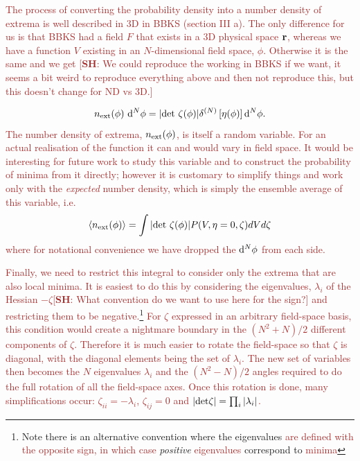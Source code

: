 \documentclass[12pt]{article}
\newcommand{\SH}[1]{\textcolor{brown}{[{\bf SH}: #1]}}
\newcommand{\sh}[1]{\textcolor{brown}{#1}}
\begin{document}
\sh{The process of converting the probability density into a number density of extrema is well described in 3D in BBKS \cite{BBKS} (section III a). The only difference for us is that BBKS had a field $F$ that exists in a 3D physical space ${\bf r}$, whereas we have a function $V$ existing in an $N$-dimensional field space, $\phi$. Otherwise it is the same and we get} \SH{We could reproduce the working in BBKS if we want, it seems a bit weird to reproduce everything above and then not reproduce this, but this doesn't change for ND vs 3D.}

\begin{equation}
n_{\rm ext}(\phi) \,\,{\rm d}^N \phi= |{\rm det}\,\, \zeta(\phi)| \delta^{(N)}\left[ \eta(\phi)\right] {\rm d}^N \phi.
\end{equation}
%
\sh{The number density of extrema, $n_{\rm ext}(\phi)$, is itself a random variable. For an actual realisation of the function it can and would vary in field space. It would be interesting for future work to study this variable and to construct the probability of minima from it directly; however it is customary to simplify things and work only with the \emph{expected} number density, which is simply the ensemble average of this variable, i.e.}
\begin{equation}
\langle n_{\rm ext}(\phi)  \rangle= \int |{\rm det}\,\, \zeta(\phi)| P(V,\eta=0,\zeta)dV d\zeta
\end{equation}
\sh{where for notational convenience we have dropped the ${\rm d}^N \phi$ from each side.}

\sh{Finally, we need to restrict this integral to consider only the extrema that are also local minima. It is easiest to do this by considering the eigenvalues, $\lambda_i$ of the Hessian $-\zeta$\SH{What convention do we want to use here for the sign?} and restricting them to be negative.\footnote{Note there is an alternative convention where the eigenvalues \sh{are defined with the opposite sign, in which case} \emph{positive} \sh{eigenvalues} correspond to \sh{minima}} For $\zeta$ expressed in an arbitrary field-space basis, this condition would create a nightmare boundary in the $(N^2+N)/2$ different components of $\zeta$. Therefore it is much easier to rotate the field-space so that $\zeta$ is diagonal, with the diagonal elements being the set of $\lambda_i$. The new set of variables then becomes the $N$ eigenvalues $\lambda_i$ and the $(N^2-N)/2$ angles required to do the full rotation of all the field-space axes. Once this rotation is done, many simplifications occur: $\zeta_{ii}=-\lambda_i$, $\zeta_{ij}=0$ and $|{\rm det} \zeta| = \prod_i |\lambda_i|$.}
\end{document}
